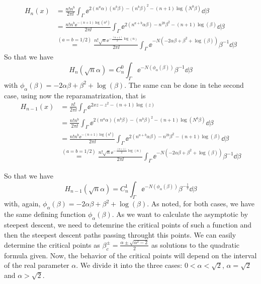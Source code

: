 \begin{equation*}
	\begin{split}
		H_n(x) & = \frac{n! n^b}{2\pi \ii} \int_{\Gamma} \ee^{2(n^a \alpha)(n^b \beta)-(n^b \beta)^2 - (n+1)\log{(N^b \beta)}} \dd \beta \\
		& = \frac{n! n^b \ee^{-(n+1) \log{(n^b)}}}{2\pi \ii} \int_{\Gamma} \ee^{2(n^{a+b} \alpha \beta)-n^{2 b} \beta^2 - (n+1)\log{(\beta)}} \dd \beta \\
		& \stackrel{(a = b = 1/2)}{=}   \frac{n! \sqrt{n} \ee^{-\frac{(n+1)}{2} \log{(n)}}}{2\pi \ii} \int_{\Gamma}  \ee^{-N(-2 \alpha \beta+ \beta^2 + \log{(\beta)})} \beta^{-1} \dd \beta
	\end{split}
\end{equation*}
So that we have \[H_n(\sqrt{n}\alpha) = C_n^0 \int_{\Gamma}  \ee^{-N(\phi_\alpha(\beta))} \beta^{-1} \dd \beta\] with $\phi_\alpha(\beta) = -2 \alpha \beta+ \beta^2 + \log{(\beta)}$.  The same can be done in tehe second case, using now the reparamatrization, that is
\begin{equation*}
	\begin{split}
		H_{n-1}(x) &=  \frac{n!}{2\pi \ii} \int_{\Gamma} \ee^{2xz-z^2 - (n+1)\log{(z)}}  \\
		& = \frac{n! n^b}{2\pi \ii} \int_{\Gamma} \ee^{2(n^a \alpha)(n^b \beta)-(n^b \beta)^2 - (n+1)\log{(N^b \beta)}} \dd \beta \\
		& = \frac{n! n^b \ee^{-(n+1) \log{(n^b)}}}{2\pi \ii} \int_{\Gamma} \ee^{2(n^{a+b} \alpha \beta)-n^{2 b} \beta^2 - (n+1)\log{(\beta)}} \dd \beta \\
		& \stackrel{(a = b = 1/2)}{=}   \frac{n! \sqrt{n} \ee^{-\frac{(n+1)}{2} \log{(n)}}}{2\pi \ii} \int_{\Gamma}  \ee^{-N(-2 \alpha \beta+ \beta^2 + \log{(\beta)})} \beta^{-1} \dd \beta
	\end{split}
\end{equation*}

So that we have \[H_{n-1}(\sqrt{n}\alpha) = C_n^1 \int_{\Gamma}  \ee^{-N(\phi_\alpha(\beta))} \beta^{-\frac{1}{2}} \dd \beta\] with, again,  $\phi_\alpha(\beta) = -2 \alpha \beta+ \beta^2 + \log{(\beta)}$. As noted, for both cases, we have the same defining function $\phi_\alpha(\beta)$. As we want to calculate the asymptotic by steepest descent, we need to detemrine the critical points of such a function and then the steepest descent paths passing throught this points. We can easily determine the critical points as $\beta_c^\pm = \frac{\alpha \pm \sqrt{{\alpha}^2 - 2}}{2}$ as solutions to the quadratic formula given. Now, the behavior of the critical points will depend on the interval of the real parameter $\alpha$. We divide it into the three cases: $0 < \alpha < \sqrt{2}$, $\alpha = \sqrt{2}$ and  $\alpha > \sqrt{2}$.

